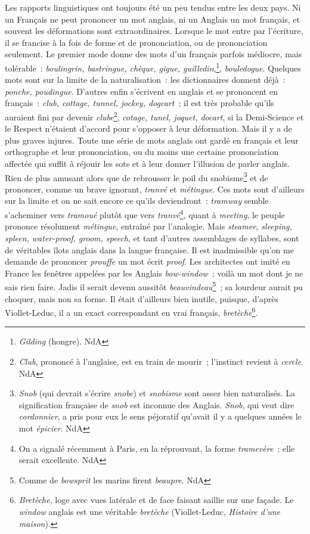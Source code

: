 \documentclass[french,twoside]{book} %
\begin{document}
Les rapports linguistiques ont toujours été un peu tendus entre les deux pays. Ni un Français ne peut prononcer un mot anglais, ni un Anglais un mot français, et souvent les déformations sont extraordinaires. Lorsque le mot entre par l’écriture, il se francise à la fois de forme et de prononciation, ou de prononciation seulement. Le premier mode donne des mots d’un français parfois médiocre, mais tolérable : {\itshape boulingrin, bastringue, chèque, gigue, guilledin},\footnote{{\itshape Gilding} (hongre). NdA}, {\itshape bouledogue}. Quelques mots sont sur la limite de la naturalisation : les dictionnaires donnent déjà : {\itshape ponche, poudingue}. D’autres enfin s’écrivent en anglais et se prononcent en français : {\itshape club, cottage, tunnel, jockey, dogcart} ; il est très probable qu’ils auraient fini par devenir {\itshape clube}\footnote{{\itshape Club}, prononcé à l’anglaise, est en train de mourir ; l’instinct revient à {\itshape cercle}. NdA}, {\itshape cotage, tunel, joquet, docart}, si la Demi-Science et le Respect n’étaient d’accord pour s’opposer à leur déformation. Mais il y a de plus graves injures. Toute une série de mots anglais ont gardé en français et leur orthographe et leur prononciation, ou du moins une certaine prononciation affectée qui suffit à réjouir les sots et à leur donner l’illusion de parler anglais. Rien de plus amusant alors que de rebrousser le poil du snobisme\footnote{{\itshape Snob} (qui devrait s’écrire {\itshape snobe}) et {\itshape snobisme} sont assez bien naturalisés. La signification française de {\itshape snob} est inconnue des Anglais. {\itshape Snob}, qui veut dire {\itshape cordonnier}, a pris pour eux le sens péjoratif qu’avait il y a quelques années le mot {\itshape épicier}. NdA} et de prononcer, comme un brave ignorant, {\itshape tranvé} et {\itshape métingue}. Ces mots sont d’ailleurs sur la limite et on ne sait encore ce qu’ils deviendront : {\itshape tramway} semble s’acheminer vers {\itshape tramoué} plutôt que vers {\itshape tranvé}\footnote{On a signalé récemment à Paris, en la réprouvant, la forme {\itshape tramevère} ; elle serait excellente. NdA}, quant à {\itshape meeting}, le peuple prononce résolument {\itshape métingue}, entraîné par l’analogie. Mais {\itshape steamer, sleeping, spleen, water-proof, groom, speech}, et tant d’autres assemblages de syllabes, sont de véritables îlots anglais dans la langue française. Il est inadmissible qu’on me demande de prononcer {\itshape prouffe} un mot écrit {\itshape proof}. Les architectes ont imité en France les fenêtres appelées par les Anglais {\itshape bow-window} ; voilà un mot dont je ne sais rien faire. Jadis il serait devenu aussitôt {\itshape beauvindeau}\footnote{Comme de {\itshape bowsprit} les marins firent {\itshape beaupre}. NdA} ; sa lourdeur aurait pu choquer, mais non sa forme. Il était d’ailleurs bien inutile, puisque, d’après Viollet-Leduc, il a un exact correspondant en vrai français, {\itshape bretèche}\footnote{{\itshape Bretèche}, loge avec vues latérale et de face faisant saillie sur une façade. Le {\itshape window} anglais est une véritable {\itshape bretèche} (Viollet-Leduc, {\itshape Histoire d’une maison}).}.\par
\end{document}
